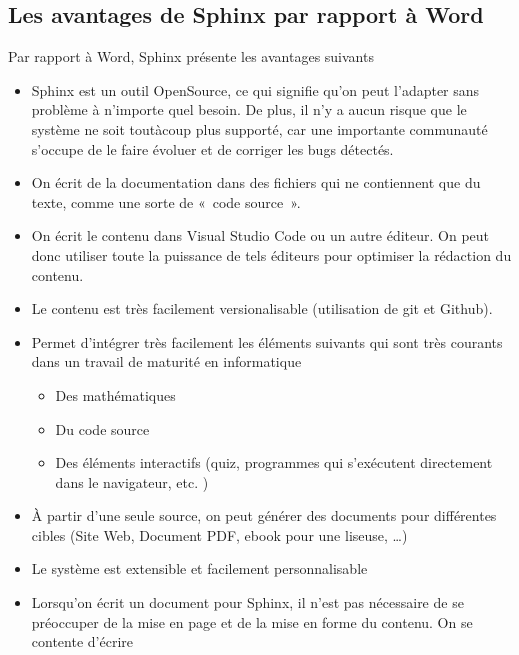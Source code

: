 \documentclass[a4,10pt,french]{sphinxmanual}
\begin{document}
\subsection{Les avantages de Sphinx par rapport à Word}
\label{\detokenize{tutoriel-sphinx/fonctionnement:les-avantages-de-sphinx-par-rapport-a-word}}
\sphinxAtStartPar
Par rapport à Word, Sphinx présente les avantages suivants
\begin{itemize}
\item {} 
\sphinxAtStartPar
Sphinx est un outil Open\sphinxhyphen{}Source, ce qui signifie qu’on peut l’adapter sans
problème à n’importe quel besoin. De plus, il n’y a aucun risque que le
système ne soit tout\sphinxhyphen{}à\sphinxhyphen{}coup plus supporté, car une importante communauté s’occupe de le faire évoluer et de corriger les bugs détectés.

\item {} 
\sphinxAtStartPar
On écrit de la documentation dans des fichiers qui ne contiennent que du
texte, comme une sorte de « code source ».

\item {} 
\sphinxAtStartPar
On écrit le contenu dans Visual Studio Code ou un autre éditeur. On peut donc
utiliser toute la puissance de tels éditeurs pour optimiser la rédaction du contenu.

\item {} 
\sphinxAtStartPar
Le contenu est très facilement versionalisable (utilisation de git et Github).

\item {} 
\sphinxAtStartPar
Permet d’intégrer très facilement les éléments suivants qui sont très courants
dans un travail de maturité en informatique
\begin{itemize}
\item {} 
\sphinxAtStartPar
Des mathématiques

\item {} 
\sphinxAtStartPar
Du code source

\item {} 
\sphinxAtStartPar
Des éléments interactifs (quiz, programmes qui s’exécutent directement dans
le navigateur, etc. )

\end{itemize}

\item {} 
\sphinxAtStartPar
À partir d’une seule source, on peut générer des documents pour différentes
cibles (Site Web, Document PDF, e\sphinxhyphen{}book pour une liseuse, …)

\item {} 
\sphinxAtStartPar
Le système est extensible et facilement personnalisable

\item {} 
\sphinxAtStartPar
Lorsqu’on écrit un document pour Sphinx, il n’est pas nécessaire de se
préoccuper de la mise en page et de la mise en forme du contenu. On se
contente d’écrire

\end{itemize}
\end{document}
